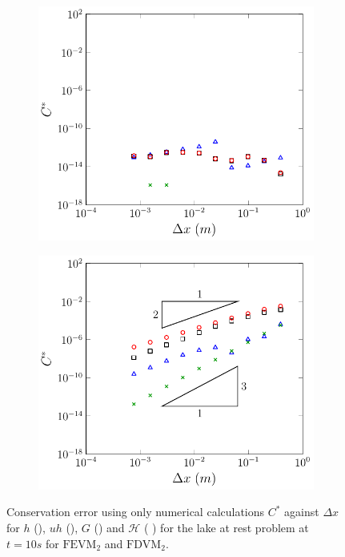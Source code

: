 \begin{figure}
\begin{subfigure}{0.5\textwidth}
		\vspace{0.5cm}
	\end{subfigure}
	\begin{subfigure}{0.5\textwidth}
		\includegraphics[width=\textwidth]{./chp5/figures/Analytic/LakeAtRest/C1/Num/FDVM2WB.pdf}
	\end{subfigure}%
	\begin{subfigure}{0.5\textwidth}
		\includegraphics[width=\textwidth]{./chp5/figures/Analytic/LakeAtRest/C1/Num/FDVM2nWB.pdf}
	\end{subfigure}
	\caption{Conservation error using only numerical calculations $C^*$ against $\Delta x$ for $h$ (), $uh$ (), $G$ () and $\mathcal{H}$ ({\color{green!60!black} }) for the lake at rest problem at $t=10s$ for $\text{FEVM}_2$ and $\text{FDVM}_2$.}
	\label{fig:LakeAtRestEC*1}
\end{figure}   

